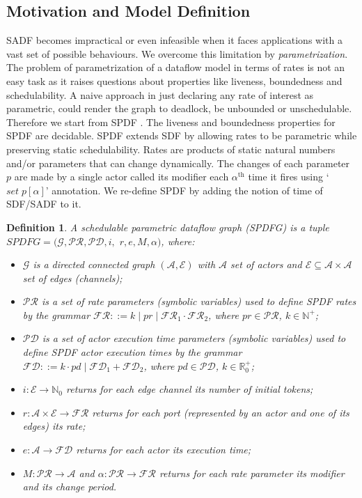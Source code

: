 \documentclass[]{eptcs}
\newtheorem{mydef}{Definition}
\begin{document}
\subsection{Motivation and Model Definition}
SADF becomes impractical or even infeasible when it faces applications with a vast set of possible behaviours. We overcome this limitation by \textit{parametrization}. The problem of parametrization of a dataflow model in terms of rates is not an easy task as it raises questions about properties like liveness, boundedness and schedulability. A naive approach in just declaring any rate of interest as parametric, could render the graph to deadlock, be unbounded or unschedulable. Therefore we start from SPDF \cite{2frad:all}. The liveness and boundedness properties for SPDF are decidable. SPDF extends SDF by allowing rates to be parametric while preserving static schedulability. Rates are products of static natural numbers and/or parameters that can change dynamically. The changes of each parameter $p$ are made by a single actor called its modifier each $\alpha^\mathrm{th}$ time it fires using `$\mathit{set} \; p[\alpha]$' annotation. We re-define SPDF \cite{2frad:all} by adding the notion of time of SDF/SADF to it.
\begin{mydef}
A schedulable parametric dataflow graph (SPDFG) is a tuple  $\mathit{SPDFG}=(\mathcal{G}, \mathcal{PR}, \mathcal{PD}, i,$ $ r, e, M, \alpha)$, where:
\label{def:psadf}
\begin{itemize}
\item $\mathcal{G}$ is a directed connected graph $(\mathcal{A},\mathcal{E})$ with $\mathcal{A}$ set of actors and $\mathcal{E} \subseteq \mathcal{A} \times \mathcal{A}$ set of edges (\textit{channels});
\item $\mathcal{PR}$ is a set of rate parameters (symbolic variables) used to define SPDF rates by the grammar $ \mathcal{FR} ::= k \mid pr \mid \mathcal{FR}_1 \cdot \mathcal{FR}_2 $, where $pr \in \mathcal{PR}$, $ k \in \mathbb{N}^+$;
\item $\mathcal{PD}$ is a set of actor execution time parameters (symbolic variables) used to define SPDF actor execution times by the grammar $ \mathcal{FD} ::= k \cdot pd \mid \mathcal{FD}_1+\mathcal{FD}_2$, where $pd \in \mathcal{PD}$, $ k \in \mathbb{R}^+_0$;
\item $i:\mathcal{E} \rightarrow \mathbb{N}_{0}$ returns for each edge \textit{channel} its number of initial tokens;
\item $r:\mathcal{A} \times \mathcal{E} \rightarrow \mathcal{FR}$ returns for each port (represented by an actor and one of its edges) its rate;
\item $e:\mathcal{A} \rightarrow \mathcal{FD}$ returns for each actor its execution time;
\item $ M:\mathcal{PR} \rightarrow \mathcal{A}$ and $\alpha: \mathcal{PR} \rightarrow \mathcal{FR}$ returns for each rate parameter its modifier and its change period.
\end{itemize}
\end{mydef}
\end{document}
